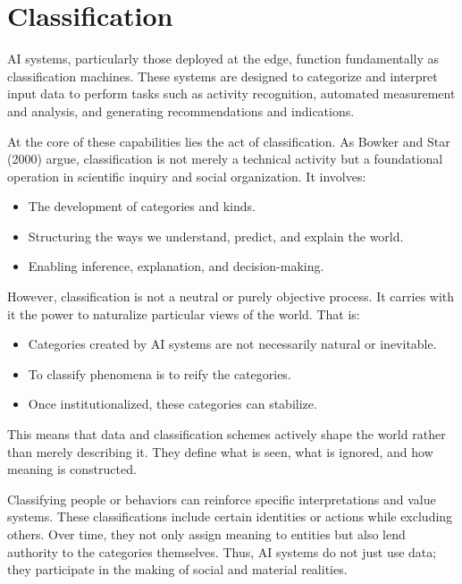 \section{Classification}

AI systems, particularly those deployed at the edge, function fundamentally as classification machines. 
These systems are designed to categorize and interpret input data to perform tasks such as activity recognition, automated measurement and analysis, and generating recommendations and indications. 

At the core of these capabilities lies the act of classification.
As Bowker and Star (2000) argue, classification is not merely a technical activity but a foundational operation in scientific inquiry and social organization. 
It involves:
\begin{itemize}
    \item The development of categories and kinds.
    \item Structuring the ways we understand, predict, and explain the world.
    \item Enabling inference, explanation, and decision-making.
\end{itemize}
\noindent However, classification is not a neutral or purely objective process. It carries with it the power to naturalize particular views of the world. That is:
\begin{itemize}
    \item Categories created by AI systems are not necessarily natural or inevitable.
    \item To classify phenomena is to reify the categories.
    \item Once institutionalized, these categories can stabilize.
\end{itemize}
This means that data and classification schemes actively shape the world rather than merely describing it. 
They define what is seen, what is ignored, and how meaning is constructed.

Classifying people or behaviors can reinforce specific interpretations and value systems.
These classifications include certain identities or actions while excluding others.
Over time, they not only assign meaning to entities but also lend authority to the categories themselves.
Thus, AI systems do not just use data; they participate in the making of social and material realities.